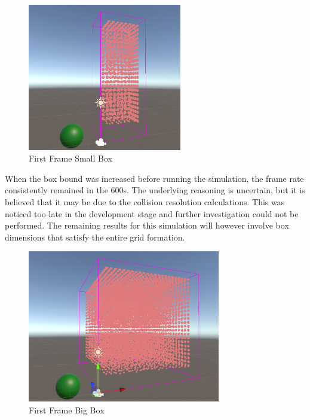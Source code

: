 \documentclass[a4paper, 12pt]{article}
\begin{document}
    \begin{figure}[H]
        \begin{center}
            \includegraphics[width=0.6\textwidth]{firstFrameSmallBox.png}
            \caption{First Frame Small Box}
        \end{center}
    \end{figure}
    
    When the box bound was increased before running the simulation, the frame rate consistently remained in the 600s. The underlying reasoning is uncertain, but it is believed that it may be due to the collision resolution calculations. This was noticed too late in the development stage and further investigation could not be performed. The remaining results for this simulation will however involve box dimensions that satisfy the entire grid formation.

    \begin{figure}[H]
        \begin{center}
            \includegraphics[width=0.75\textwidth]{firstFrameBigBox.png}
            \caption{First Frame Big Box}
        \end{center}
    \end{figure}
\end{document}
